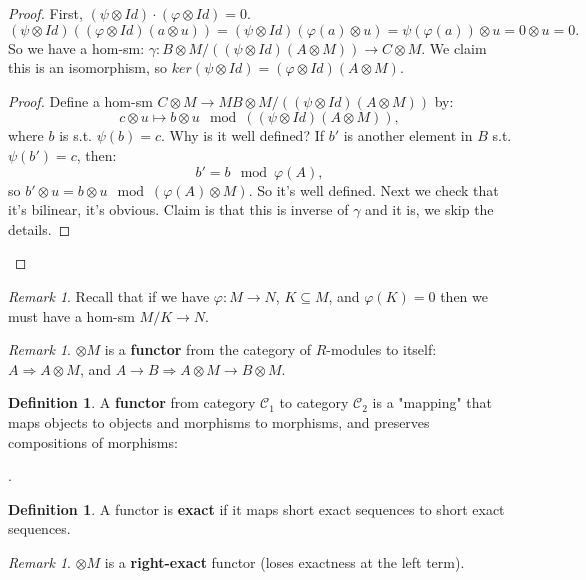 \documentclass[9pt,reqno,twoside]{amsbook}
\theoremstyle{plain}
\numberwithin{section}{chapter}
\numberwithin{equation}{chapter}
\theoremstyle{definition}
\newtheorem{Def}[theorem]{Definition}
\theoremstyle{remark}
\newtheorem{rem}[theorem]{Remark}
\theoremstyle{plain}
\newcommand{\sub}{\subseteq}
\newcommand{\tens}{\otimes}
\renewcommand{\phi}{\varphi}
\begin{document}
\begin{proof}
First, $(\psi \tens Id)\cdot(\phi \tens Id) = 0$.
$$
(\psi \tens Id)((\phi \tens Id)(a \tens u)) = (\psi \tens Id)(\phi(a) \tens u) = \psi(\phi(a)) \tens u = 0 \tens u = 0.
$$
So we have a hom-sm: $\gamma:B \tens M/((\psi \tens Id)(A \tens M)) \to C \tens M$. We claim this is an isomorphism, so $ker(\psi \tens Id) = (\phi \tens Id)(A \tens M)$. 
\begin{proof}
Define a hom-sm $C \tens M \to M B \tens M/((\psi \tens Id)(A \tens M))$ by:
$$
c \tens u \mapsto b \tens u \mod ((\psi \tens Id)(A \tens M)),
$$
where $b$ is s.t. $\psi(b) = c$. Why is it well defined? If $b'$ is another element in $B$ s.t. $\psi(b') = c$, then:
$$
b' = b \mod \phi(A),
$$
 so $b' \tens u = b \tens u \mod (\phi(A) \tens M)$. So it's well defined. Next we check that it's bilinear, it's obvious. Claim is that this is inverse of $\gamma$ and it is, we skip the details. 
\end{proof}
\end{proof}

\begin{rem}
Recall that if we have $\phi:M \to N$, $K \sub M$, and $\phi(K) = 0$ then we must have a hom-sm $M/K \to N$. 
\end{rem}

\begin{rem}
$\tens M$ is a \textbf{functor} from the category of $R$-modules to itself:
$A \Rightarrow A \tens M$, and $A \to B \Rightarrow A \tens M \to B \tens M$. 
\end{rem}

\begin{Def}
A \textbf{functor} from category $\mathcal{C}_1$ to category $\mathcal{C}_2$ is a "mapping" that maps objects to objects and morphisms to morphisms, and preserves compositions of morphisms:
\begin{center}
.
\end{center}
\end{Def}

\begin{Def}
A functor is \textbf{exact} if it maps short exact sequences to short exact sequences. 
\end{Def}

\begin{rem}
$\tens M$ is a \textbf{right-exact} functor (loses exactness at the left term). 
\end{rem}
\end{document}
